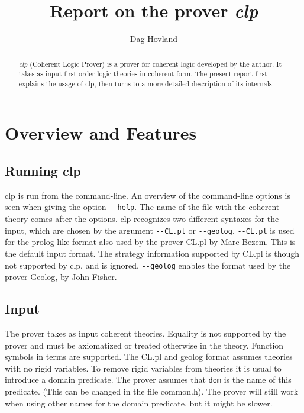 \documentclass[a4paper]{article}
\author{Dag Hovland}
\title{Report on the prover \emph{clp}}
\begin{document}
\maketitle
\begin{abstract}
  \emph{clp} (Coherent Logic Prover) is a prover for coherent logic developed by the author. It takes as input first order logic theories in coherent form. The present report first explains the usage of clp, then turns to a more detailed description of its internals.
\end{abstract}
\section{Overview and Features}
\subsection{Running clp}
clp is run from the command-line. An overview of the command-line options is seen when giving the option \verb|--help|. The name of the file with the coherent theory comes after the options. clp recognizes two different syntaxes for the input, which are chosen by the argument \verb|--CL.pl| or \verb|--geolog|. \verb|--CL.pl| is used for the prolog-like format also used by the prover CL.pl by Marc Bezem. This is the default input format. The strategy information supported by CL.pl is though not supported by clp, and is ignored. \verb|--geolog| enables the format used by the prover Geolog, by John Fisher.

\subsection{Input}
The prover takes as input coherent theories. Equality is not supported by the prover and must be axiomatized or treated otherwise in the theory. Function symbols in terms are supported. The CL.pl and geolog format assumes theories with no rigid variables. To remove rigid variables from theories it is usual to introduce a domain predicate. The prover assumes that \verb|dom| is the name of this predicate. (This can be changed in the file common.h). The prover will still work when using other names for the domain predicate, but it might be slower. 
\end{document}
